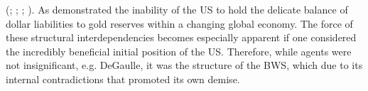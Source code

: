 \documentclass[11pt]{article}
\begin{document}
(\cite{KlimiukZbigniew2016TPaO,bordo2014tales, }; \cite[p.~229-230]{BeaudMichel1983Ahoc};  \cite[p.~73]{1993Arot}; \cite[p.~197]{JonesDanielStedman2014Motu}). 
As demonstrated the inability of the US to hold the delicate balance of dollar liabilities to gold reserves within a changing global economy. The force of these structural interdependencies becomes especially apparent if one considered the incredibly beneficial initial position of the US. Therefore, while agents were not insignificant, e.g. DeGaulle, it was the structure of the BWS, which due to its internal contradictions that promoted its own demise. \\
\end{document}
